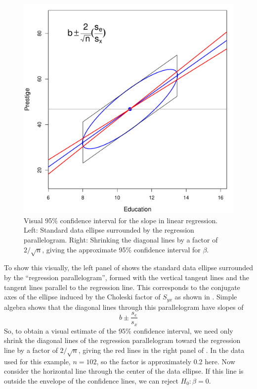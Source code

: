 \begin{figure}[htb]
\begin{minipage}[c]{.49\textwidth}
   \includegraphics[width=1\linewidth,clip]{fig/vis-reg-prestige2}
  \end{minipage}
  \caption{Visual 95\% confidence interval for the slope in linear regression. Left: Standard data ellipse surrounded by the 
  regression parallelogram. Right: Shrinking the diagonal lines by a factor of $2/\sqrt{n}$,
  giving the approximate 95\% confidence interval for $\beta$.}%
  \label{vis-reg-prestige}
\end{figure}

To show this visually, the left panel of  shows the standard data ellipse
surrounded by the ``regression parallelogram'', formed with the vertical tangent lines and the
tangent lines parallel to the regression line. This corresponds to the conjugate axes of the
ellipse induced by the Choleski factor of $S_{yx}$ as shown in .
Simple algebra shows that the diagonal lines through
this parallelogram have slopes of
\begin{equation*}
 b \pm \frac{s_{e}}{s_x}
\end{equation*}
So, to obtain a visual estimate of the 95\% confidence interval, we need only shrink the diagonal lines of the
regression parallelogram toward the regression line by a factor of $2/\sqrt{n}$, giving the red lines
in the right panel of .  
In the data used for this
example, $n=102$, so the factor  is approximately 0.2 here.
Now consider the horizontal line through the center of the data ellipse.  If this line is outside the 
envelope of the confidence lines, we can reject $H_0 : \beta = 0$.
